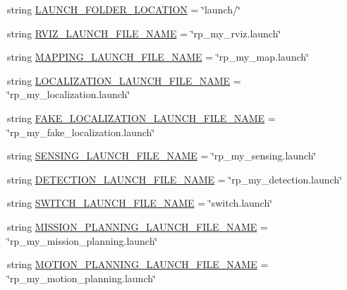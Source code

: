 \begin{DoxyCompactItemize}
string \hyperlink{namespacerp__manager_af0ff9dba303cc42af7c94b91bd577a4f}{L\+A\+U\+N\+C\+H\+\_\+\+F\+O\+L\+D\+E\+R\+\_\+\+L\+O\+C\+A\+T\+I\+ON} = \char`\"{}launch/\char`\"{}
\item 
string \hyperlink{namespacerp__manager_afed1d2027e1ae55feaab901b6ace615f}{R\+V\+I\+Z\+\_\+\+L\+A\+U\+N\+C\+H\+\_\+\+F\+I\+L\+E\+\_\+\+N\+A\+ME} = \char`\"{}rp\+\_\+my\+\_\+rviz.\+launch\char`\"{}
\item 
string \hyperlink{namespacerp__manager_aac197302609510b15a932831ab9345f6}{M\+A\+P\+P\+I\+N\+G\+\_\+\+L\+A\+U\+N\+C\+H\+\_\+\+F\+I\+L\+E\+\_\+\+N\+A\+ME} = \char`\"{}rp\+\_\+my\+\_\+map.\+launch\char`\"{}
\item 
string \hyperlink{namespacerp__manager_a6dcd95bd9477c77584799b731cf6e853}{L\+O\+C\+A\+L\+I\+Z\+A\+T\+I\+O\+N\+\_\+\+L\+A\+U\+N\+C\+H\+\_\+\+F\+I\+L\+E\+\_\+\+N\+A\+ME} = \char`\"{}rp\+\_\+my\+\_\+localization.\+launch\char`\"{}
\item 
string \hyperlink{namespacerp__manager_ac4cd90df1f22dfc4387eb36bcfd8215c}{F\+A\+K\+E\+\_\+\+L\+O\+C\+A\+L\+I\+Z\+A\+T\+I\+O\+N\+\_\+\+L\+A\+U\+N\+C\+H\+\_\+\+F\+I\+L\+E\+\_\+\+N\+A\+ME} = \char`\"{}rp\+\_\+my\+\_\+fake\+\_\+localization.\+launch\char`\"{}
\item 
string \hyperlink{namespacerp__manager_a4b5be1d16a3c9ba81e23daa96404fcaa}{S\+E\+N\+S\+I\+N\+G\+\_\+\+L\+A\+U\+N\+C\+H\+\_\+\+F\+I\+L\+E\+\_\+\+N\+A\+ME} = \char`\"{}rp\+\_\+my\+\_\+sensing.\+launch\char`\"{}
\item 
string \hyperlink{namespacerp__manager_abf958196458f1890b8b9077998975e2e}{D\+E\+T\+E\+C\+T\+I\+O\+N\+\_\+\+L\+A\+U\+N\+C\+H\+\_\+\+F\+I\+L\+E\+\_\+\+N\+A\+ME} = \char`\"{}rp\+\_\+my\+\_\+detection.\+launch\char`\"{}
\item 
string \hyperlink{namespacerp__manager_afa1029c78f6d8652ba47f268602aacf4}{S\+W\+I\+T\+C\+H\+\_\+\+L\+A\+U\+N\+C\+H\+\_\+\+F\+I\+L\+E\+\_\+\+N\+A\+ME} = \char`\"{}switch.\+launch\char`\"{}
\item 
string \hyperlink{namespacerp__manager_a8385af25b9217972b5859c9bc28dcce2}{M\+I\+S\+S\+I\+O\+N\+\_\+\+P\+L\+A\+N\+N\+I\+N\+G\+\_\+\+L\+A\+U\+N\+C\+H\+\_\+\+F\+I\+L\+E\+\_\+\+N\+A\+ME} = \char`\"{}rp\+\_\+my\+\_\+mission\+\_\+planning.\+launch\char`\"{}
\item 
string \hyperlink{namespacerp__manager_ad8005b248e4af4a6127f9aaf678f7447}{M\+O\+T\+I\+O\+N\+\_\+\+P\+L\+A\+N\+N\+I\+N\+G\+\_\+\+L\+A\+U\+N\+C\+H\+\_\+\+F\+I\+L\+E\+\_\+\+N\+A\+ME} = \char`\"{}rp\+\_\+my\+\_\+motion\+\_\+planning.\+launch\char`\"{}
\item 

\end{DoxyCompactItemize}
